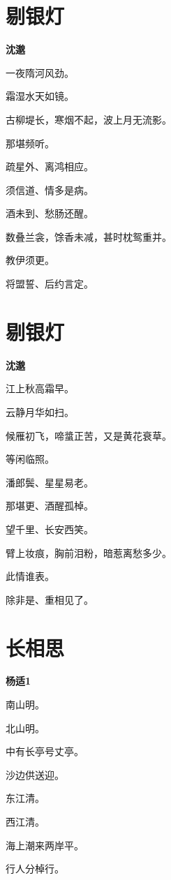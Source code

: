 \documentclass[12pt,a4paper]{ctexbook}
\begin{document}
\section{剔银灯}
\textbf{沈邈}\par\vspace{0.5em}
一夜隋河风劲。\par
霜湿水天如镜。\par
古柳堤长，寒烟不起，波上月无流影。\par
那堪频听。\par
疏星外、离鸿相应。\par
须信道、情多是病。\par
酒未到、愁肠还醒。\par
数叠兰衾，馀香未减，甚时枕鸳重并。\par
教伊须更。\par
将盟誓、后约言定。\par

\section{剔银灯}
\textbf{沈邈}\par\vspace{0.5em}
江上秋高霜早。\par
云静月华如扫。\par
候雁初飞，啼螀正苦，又是黄花衰草。\par
等闲临照。\par
潘郎鬓、星星易老。\par
那堪更、酒醒孤棹。\par
望千里、长安西笑。\par
臂上妆痕，胸前泪粉，暗惹离愁多少。\par
此情谁表。\par
除非是、重相见了。\par

\section{长相思}
\textbf{杨适1}\par\vspace{0.5em}
南山明。\par
北山明。\par
中有长亭号丈亭。\par
沙边供送迎。\par
东江清。\par
西江清。\par
海上潮来两岸平。\par
行人分棹行。\par
\end{document}
